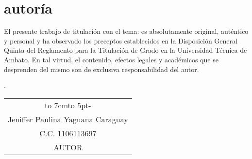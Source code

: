 \chapter*{autoría}
El presente trabajo de titulaci\'on con el tema: {\MakeUppercase\tema} es absolutamente original, auténtico y personal y ha observado
los preceptos establecidos en la Disposición General Quinta del Reglamento para la
Titulación de Grado en la Universidad Técnica de Ambato. En tal virtud, el contenido,
efectos legales y académicos que se desprenden del mismo son de exclusiva
responsabilidad del autor.\begin{flushright}
	\lugarFechaPrelims.
\end{flushright}

\vspace*{5cm}
\begin{center}
	\begin{tabular}{c}
		\hbox to 7cm{\leaders\hbox to 5pt{\hss - \hss}\hfil} \\
		Jeniffer Paulina Yaguana Caraguay                    \\
		C.C. 1106113697                                      \\
		AUTOR
	\end{tabular}
\end{center}
